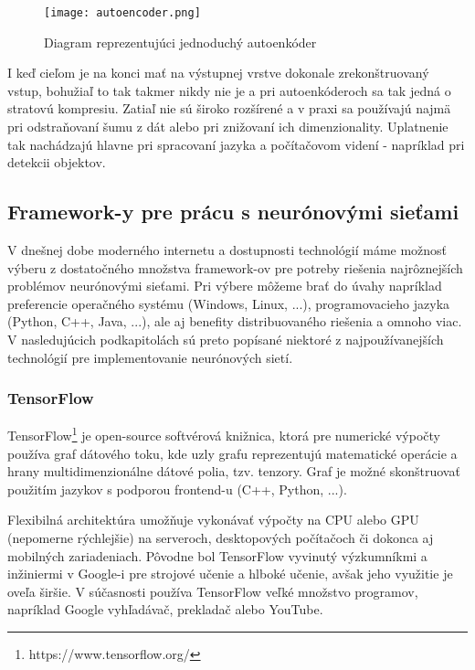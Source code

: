 \begin{figure}[H]
	\begin{center}\texttt{[image: autoencoder.png]}
		\caption[Príklad jednoduchého autoenkóderu]{
			Diagram reprezentujúci jednoduchý autoenkóder\footnotemark
		}\label{autoencoder_graph}
	\end{center}
\end{figure}


I keď cieľom je na konci mať na výstupnej vrstve dokonale zrekonštruovaný vstup, bohužiaľ to tak takmer nikdy nie je a pri autoenkóderoch sa tak jedná o stratovú kompresiu. Zatiaľ nie sú široko rozšírené a v praxi sa používajú najmä pri odstraňovaní šumu\cite{autoencoder_denoising} z dát alebo pri znižovaní ich dimenzionality. Uplatnenie tak nachádzajú hlavne pri spracovaní jazyka\cite{autoencoder_nlp} a počítačovom videní - napríklad pri detekcii objektov\cite{autoencoder_artur}.
 
\subsection{Framework-y pre prácu s neurónovými sieťami}
V dnešnej dobe moderného internetu a dostupnosti technológií máme možnosť výberu z dostatočného množstva framework-ov pre potreby riešenia najrôznejších problémov neurónovými sieťami. Pri výbere môžeme brať do úvahy napríklad preferencie operačného systému (Windows, Linux, ...), programovacieho jazyka (Python, C++, Java, ...), ale aj benefity distribuovaného riešenia a omnoho viac. V nasledujúcich podkapitolách sú preto popísané niektoré z najpoužívanejších technológií pre implementovanie neurónových sietí. 

\subsubsection{TensorFlow}
\label{tf}
TensorFlow\footnote{https://www.tensorflow.org/} je open-source softvérová knižnica, ktorá pre numerické výpočty používa graf dátového toku, kde uzly grafu reprezentujú matematické operácie a hrany multidimenzionálne dátové polia, tzv. tenzory. Graf je možné skonštruovať použitím jazykov s podporou frontend-u (C++, Python, ...). 

Flexibilná architektúra umožňuje vykonávať výpočty na CPU alebo GPU (nepomerne rýchlejšie) na serveroch, desktopových počítačoch či dokonca aj mobilných zariadeniach. Pôvodne bol TensorFlow vyvinutý výzkumníkmi a inžiniermi v Google-i pre strojové učenie a hlboké učenie, avšak jeho využitie je oveľa širšie. V súčasnosti používa TensorFlow veľké množstvo programov, napríklad Google vyhľadávač, prekladač alebo YouTube. 

